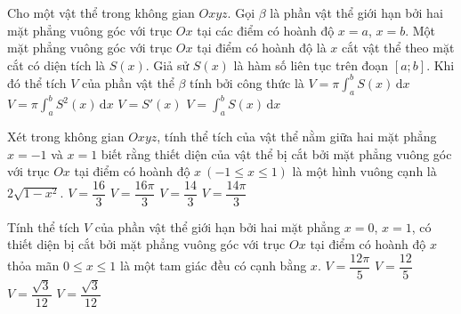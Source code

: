\begin{ex}%
	Cho một vật thể trong không gian $Oxyz$. Gọi  $\beta$ là phần vật thể giới hạn bởi hai mặt phẳng vuông góc với trục $Ox$ tại các điểm có hoành độ $x=a$, $x=b$. Một mặt phẳng vuông góc với trục $Ox$ tại điểm có hoành độ là $x$ cắt vật thể theo mặt cắt có diện tích là $S(x)$. Giả sử $S(x)$ là hàm số liên tục trên đoạn $\left[a;b\right]$. Khi đó thể tích $V$ của phần vật thể $\beta$ tính bởi công thức là
	 \choice
		{$V=\pi\displaystyle\int_a^b S(x)\mathrm{\,d}x$} 
		 {$V=\pi\displaystyle\int_a^b S^2(x)\mathrm{\,d}x$}
		{$V=S'(x)$} 
		{\True $V=\displaystyle\int_a^b S(x)\mathrm{\,d}x$} 
\end{ex}

\begin{ex}%
	Xét trong không gian $Oxyz$, tính thể tích của vật thể nằm giữa hai mặt phẳng $x=-1$ và $x=1$ biết rằng thiết diện  của vật thể bị cắt bởi mặt phẳng vuông góc với trục $Ox$ tại điểm có hoành độ $x~(-1\leq x \leq 1)$ là một hình vuông cạnh là $2\sqrt{1-x^2}$.
	\choice 
		{\True $V=\dfrac{16}{3}$} 
		{$V=\dfrac{16\pi}{3}$} 
		{$V=\dfrac{14}{3}$} 
		 {$V=\dfrac{14\pi}{3}$}
\end{ex}

\begin{ex}%
	Tính thể tích $V$ của phần vật thể giới hạn bởi hai mặt phẳng $x=0$, $x=1$, có thiết diện bị cắt bởi mặt phẳng vuông góc với trục $Ox$  tại điểm có hoành độ $x$ thỏa mãn $0 \le x \le 1$ là một tam giác đều có cạnh bằng $x$.
	\choice 
		 {$V=\dfrac{12\pi}{5}$}
		{$V=\dfrac{12}{5}$} 
		{$V=\dfrac{\sqrt{3}}{12}$} 
		{\True$V=\dfrac{\sqrt{3}}{12}$} 
\end{ex}

